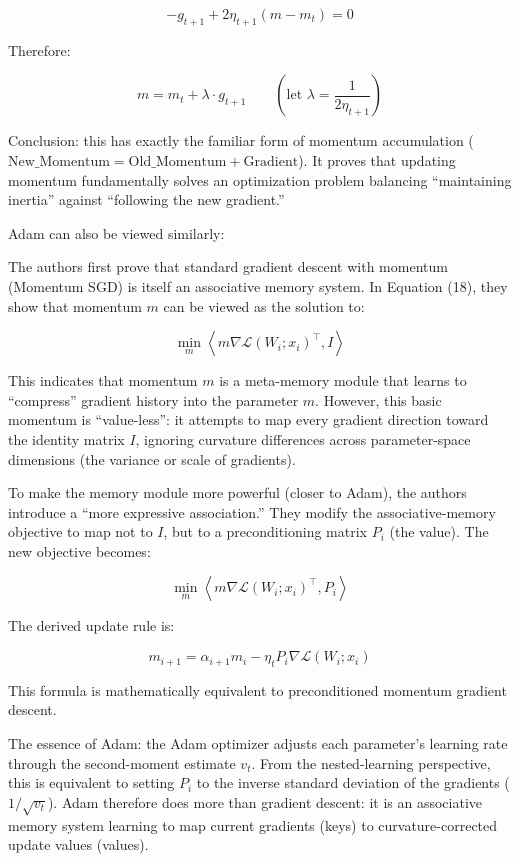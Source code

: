 \[
- g_{t+1}+2\eta_{t+1}(m-m_t)=0
\]

Therefore:

\[
m=m_t+\lambda\cdot g_{t+1}\qquad\left(\text{let }\lambda=\frac{1}{2\eta_{t+1}}\right)
\]

Conclusion: this has exactly the familiar form of momentum accumulation (\(\mathrm{New\_Momentum}=\mathrm{Old\_Momentum}+\mathrm{Gradient}\)). It proves that updating momentum fundamentally solves an optimization problem balancing ``maintaining inertia'' against ``following the new gradient.''

Adam can also be viewed similarly:

The authors first prove that standard gradient descent with momentum (Momentum SGD) is itself an associative memory system. In Equation (18), they show that momentum \(m\) can be viewed as the solution to:

\[
\min_m\left\langle m\nabla\mathcal{L}(W_i;x_i)^\top,I\right\rangle
\]

This indicates that momentum \(m\) is a meta-memory module that learns to ``compress'' gradient history into the parameter \(m\). However, this basic momentum is ``value-less'': it attempts to map every gradient direction toward the identity matrix \(I\), ignoring curvature differences across parameter-space dimensions (the variance or scale of gradients).

To make the memory module more powerful (closer to Adam), the authors introduce a ``more expressive association.'' They modify the associative-memory objective to map not to \(I\), but to a preconditioning matrix \(P_i\) (the value). The new objective becomes:

\[
\min_m\left\langle m\nabla\mathcal{L}(W_i;x_i)^\top,P_i\right\rangle
\]

The derived update rule is:

\[
m_{i+1}=\alpha_{i+1}m_i-\eta_tP_i\nabla\mathcal{L}(W_i;x_i)
\]

This formula is mathematically equivalent to preconditioned momentum gradient descent.

The essence of Adam: the Adam optimizer adjusts each parameter's learning rate through the second-moment estimate \(v_t\). From the nested-learning perspective, this is equivalent to setting \(P_i\) to the inverse standard deviation of the gradients (\(1/\sqrt{v_t}\)). Adam therefore does more than gradient descent: it is an associative memory system learning to map current gradients (keys) to curvature-corrected update values (values).

